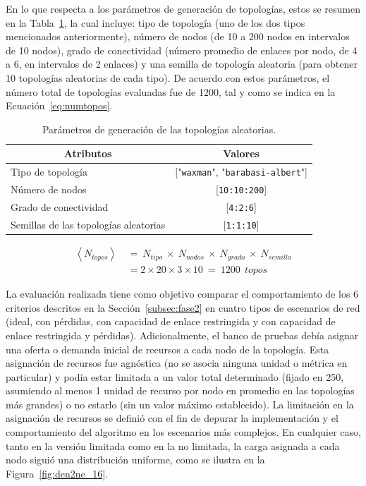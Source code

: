 En lo que respecta a los parámetros de generación de topologías, estos se resumen en la Tabla~\ref{tab:topologyParams}, la cual incluye: tipo de topología (uno de los dos tipos mencionados anteriormente), número de nodos (de 10 a 200 nodos en intervalos de 10 nodos), grado de conectividad (número promedio de enlaces por nodo, de 4 a 6, en intervalos de 2 enlaces) y una semilla de topología aleatoria (para obtener 10 topologías aleatorias de cada tipo). De acuerdo con estos parámetros, el número total de topologías evaluadas fue de 1200, tal y como se indica en la Ecuación~\ref{eq:numtopos}.


\begin{table}[ht!]
\centering
\begin{tabular}{|l|c|}
\hline
\multicolumn{1}{|c|}{\textbf{Atributos}} & \textbf{Valores} \\ \hline
Tipo de topología & {[}"\texttt{waxman}", "\texttt{barabasi-albert}"{]} \\ \hline
Número de nodos & {[}\texttt{10:10:200}{]} \\ \hline
Grado de conectividad & {[}\texttt{4:2:6}{]} \\ \hline
Semillas de las topologías aleatorias & {[}\texttt{1:1:10}{]} \\ \hline
\end{tabular}
\vspace{0.2cm}
\caption{Parámetros de generación de las topologías aleatorias.}
\label{tab:topologyParams}
\end{table}

\begin{equation}\label{eq:numtopos}
\begin{split}    
    \left \langle N_{topos} \right \rangle  \: & = { \: N_{tipo} \: \times \: N_{nodos} \: \times \:  N_{grado} \: \times \: N_{semilla}} \\
    & = 2 \times 20 \times 3 \times 10 \: = \: 1200 \: \: topos
\end{split}
\end{equation}
\vspace{0.2cm}

La evaluación realizada tiene como objetivo comparar el comportamiento de los 6 criterios descritos en la Sección~\ref{subsec:fase2} en cuatro tipos de escenarios de red (ideal, con pérdidas, con capacidad de enlace restringida y con capacidad de enlace restringida y pérdidas). Adicionalmente, el banco de pruebas debía asignar una oferta o demanda inicial de recursos a cada nodo de la topología. Esta asignación de recursos fue agnóstica (no se asocia ninguna unidad o métrica en particular) y podía estar limitada a un valor total determinado (fijado en 250, asumiendo al menos 1 unidad de recurso por nodo en promedio en las topologías más grandes) o no estarlo (sin un valor máximo establecido). La limitación en la asignación de recursos se definió con el fin de depurar la implementación y el comportamiento del algoritmo en los escenarios más complejos. En cualquier caso, tanto en la versión limitada como en la no limitada, la carga asignada a cada nodo siguió una distribución uniforme, como se ilustra en la Figura~\ref{fig:den2ne_16}.

